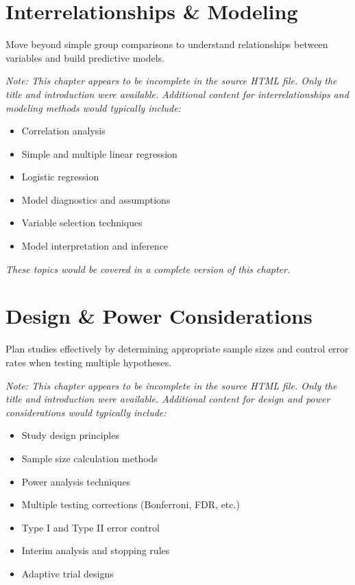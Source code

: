 \documentclass[
  11pt,
  letterpaper,
  oneside]{book}
\providecommand{\tightlist}{%
  \setlength{\itemsep}{0pt}\setlength{\parskip}{0pt}}\usepackage{longtable,booktabs,array}
\begin{document}

\chapter{Interrelationships \&
Modeling}\label{interrelationships-modeling}

Move beyond simple group comparisons to understand relationships between
variables and build predictive models.

\emph{Note: This chapter appears to be incomplete in the source HTML
file. Only the title and introduction were available. Additional content
for interrelationships and modeling methods would typically include:}

\begin{itemize}
\tightlist
\item
  Correlation analysis
\item
  Simple and multiple linear regression
\item
  Logistic regression
\item
  Model diagnostics and assumptions
\item
  Variable selection techniques
\item
  Model interpretation and inference
\end{itemize}

\emph{These topics would be covered in a complete version of this
chapter.}


\chapter{Design \& Power
Considerations}\label{design-power-considerations}

Plan studies effectively by determining appropriate sample sizes and
control error rates when testing multiple hypotheses.

\emph{Note: This chapter appears to be incomplete in the source HTML
file. Only the title and introduction were available. Additional content
for design and power considerations would typically include:}

\begin{itemize}
\tightlist
\item
  Study design principles
\item
  Sample size calculation methods
\item
  Power analysis techniques
\item
  Multiple testing corrections (Bonferroni, FDR, etc.)
\item
  Type I and Type II error control
\item
  Interim analysis and stopping rules
\item
  Adaptive trial designs
\end{itemize}
\end{document}
